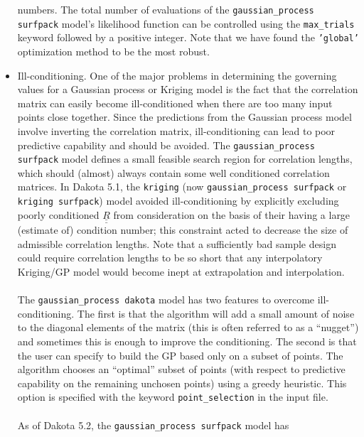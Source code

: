 \begin{itemize}
      numbers.  The total number of evaluations of the 
      \texttt{gaussian\_process surfpack} model's likelihood function can 
      be controlled using the \texttt{max\_trials} keyword followed by a 
      positive integer.  Note that we have found the \texttt{'global'} 
      optimization method to be the most robust.
\item Ill-conditioning.  One of the major problems in determining 
      the governing values for a Gaussian process or Kriging model is 
      the fact that the correlation matrix can easily become 
      ill-conditioned when there are too many input points close together.
      Since the predictions from the Gaussian process model involve 
      inverting the correlation matrix, ill-conditioning can lead to poor 
      predictive capability and should be avoided. The 
      \texttt{gaussian\_process surfpack} model defines a small feasible 
      search region for correlation lengths, which should (almost) always 
      contain some well conditioned correlation matrices. In Dakota 5.1, 
      the \texttt{kriging} (now \texttt{gaussian\_process surfpack} or
      \texttt{kriging surfpack}) model avoided 
      ill-conditioning by explicitly excluding poorly conditioned 
      $\underline{\underline{R}}$ from consideration on the basis of their 
      having a large (estimate of) condition number; this constraint acted 
      to decrease the size of admissible correlation lengths.  Note that a
      sufficiently bad sample design could require correlation lengths to 
      be so short that any interpolatory Kriging/GP model would become 
      inept at extrapolation and interpolation. \\ \\
      The \texttt{gaussian\_process dakota} model has two features to 
      overcome ill-conditioning.  The first is that the algorithm will 
      add a small amount of noise to the diagonal elements of the matrix 
      (this is often referred to as a ``nugget'') and sometimes this is 
      enough to improve the conditioning.  The second is that the user 
      can specify to build the GP based only on a subset of points.  The 
      algorithm chooses an ``optimal'' subset of points (with respect to 
      predictive capability on the remaining unchosen points) using a 
      greedy heuristic. This option is specified with the keyword 
      \texttt{point\_selection} in the input file.\\ \\
      As of Dakota 5.2, the \texttt{gaussian\_process surfpack} model has 

\end{itemize}
